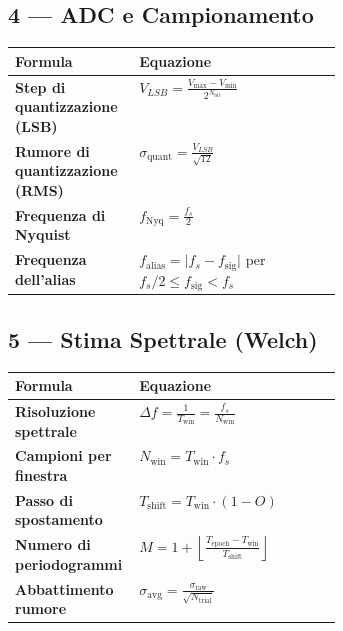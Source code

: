 \documentclass[10pt, letterpaper]{report}
\begin{document}
\bigskip
\subsection*{\large 4 \;—\; ADC e Campionamento}
\begin{tabularx}{\linewidth}{>{\bfseries}p{0.38\linewidth} X}
\toprule
Formula & Equazione \\ \midrule
Step di quantizzazione (LSB) &
  $\displaystyle V_{LSB}
   = \frac{V_{\max}-V_{\min}}{2^{N_{\mathrm{bit}}}}$ \\
Rumore di quantizzazione (RMS) &
  $\displaystyle \sigma_{\mathrm{quant}}
   = \frac{V_{LSB}}{\sqrt{12}}$ \\
Frequenza di Nyquist &
  $\displaystyle f_{\mathrm{Nyq}} = \frac{f_s}{2}$ \\
Frequenza dell'alias &
  $f_{\mathrm{alias}} = \lvert f_s - f_{\mathrm{sig}}\rvert$
  \quad per $f_s/2 \le f_{\mathrm{sig}} < f_s$ \\
\bottomrule
\end{tabularx}

\bigskip
\subsection*{\large 5 \;—\; Stima Spettrale (Welch)}
\begin{tabularx}{\linewidth}{>{\bfseries}p{0.38\linewidth} X}
\toprule
Formula & Equazione \\ \midrule
Risoluzione spettrale &
  $\displaystyle \Delta f
   = \frac{1}{T_{\mathrm{win}}} = \frac{f_s}{N_{\mathrm{win}}}$ \\
Campioni per finestra &
  $N_{\mathrm{win}} = T_{\mathrm{win}}\cdot f_s$ \\
Passo di spostamento &
  $T_{\mathrm{shift}} = T_{\mathrm{win}}\cdot(1-O)$ \\
Numero di periodogrammi &
  $\displaystyle M
   = 1+\!\left\lfloor\frac{T_{\mathrm{epoch}}-T_{\mathrm{win}}}
                          {T_{\mathrm{shift}}}\right\rfloor$ \\
Abbattimento rumore &
  $\displaystyle \sigma_{\mathrm{avg}}
   = \frac{\sigma_{\mathrm{raw}}}{\sqrt{N_{\mathrm{trial}}}}$ \\

\bottomrule
\end{tabularx}

\bigskip
\end{document}
